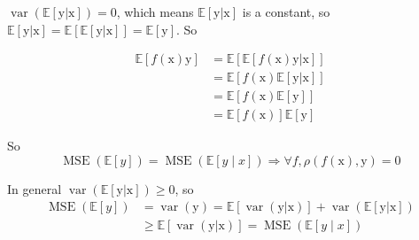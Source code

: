 \documentclass[a4paper]{article}
\begin{document}
\begin{enumerate}
\begin{enumerate}
  $\operatorname{var} (\mathbb{E}\left[\mathrm{y}|\mathrm{x}\right]) = 0$, which means $\mathbb{E}\left[\mathrm{y}|\mathrm{x}\right]$ is a constant, so $\mathbb{E}\left[\mathrm{y}|\mathrm{x}\right] = \mathbb{E}\left[\mathbb{E}\left[\mathrm{y}|\mathrm{x}\right]\right] = \mathbb{E}[\mathrm{y}]$. So 


  \begin{equation}
    \begin{aligned}
      \mathbb{E}\left[f(\mathrm{x}) \mathrm{y} \right] & = \mathbb{E}\left[\mathbb{E}\left[f(\mathrm{x}) \mathrm{y}  | \mathrm{x}\right]\right] \\
      & = \mathbb{E}\left[f(\mathrm{x})\mathbb{E}\left[ \mathrm{y}  | \mathrm{x}\right]\right] \\
      & = \mathbb{E}\left[f(\mathrm{x})\mathbb{E}\left[ \mathrm{y}\right]\right] \\
      & = \mathbb{E}\left[f(\mathrm{x})\right] \mathbb{E}\left[ \mathrm{y}\right]
    \end{aligned} 
  \end{equation}
  
  So \begin{equation}
    \operatorname{MSE}(\mathbb{E}[y])=\operatorname{MSE}(\mathbb{E}[y \mid x]) \Longrightarrow \forall f, \rho(f(\mathrm{x}),\mathrm{y}) = 0
  \end{equation}

  In general $\operatorname{var} (\mathbb{E}\left[\mathrm{y}|\mathrm{x}\right]) \geqslant 0$, so 
  \begin{equation}
    \begin{aligned}
      \operatorname{MSE}(\mathbb{E}[y]) & = \operatorname{var}(\mathrm{y}) = \mathbb{E}\left[\operatorname{var}(\mathrm{y}|\mathrm{x})\right] + \operatorname{var} (\mathbb{E}\left[\mathrm{y}|\mathrm{x}\right])\\& \geqslant \mathbb{E}\left[\operatorname{var}(\mathrm{y}|\mathrm{x})\right]  = \operatorname{MSE}(\mathbb{E}[y \mid x])
    \end{aligned}
  \end{equation}

\end{enumerate}
\end{enumerate}
  

  
\end{document}
